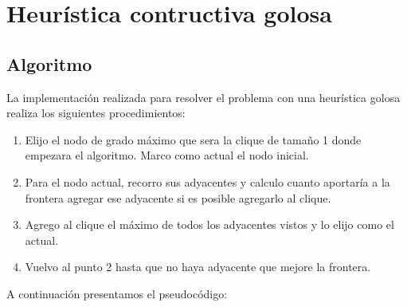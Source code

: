 \documentclass[a4paper, 10pt, twoside]{article}
\newenvironment{pseudo}[1][]{%
    \vspace{1em}%
    \begin{algorithmic}%
}
{%
    \end{algorithmic}%
    \vspace{1em}%
}
\begin{document}
\begin{pseudo}
\EndProcedure
\end{pseudo}



\newpage

\section{Heurística contructiva golosa}
\subsection{Algoritmo}
La implementación realizada para resolver el problema con una heurística golosa realiza los siguientes procedimientos:
\begin{enumerate}
\item Elijo el nodo de grado máximo que sera la clique de tamaño 1 donde empezara el algoritmo. Marco como actual el nodo inicial.
\item Para el nodo actual, recorro sus adyacentes y calculo cuanto aportaría a la frontera agregar ese adyacente si es posible agregarlo al clique.
\item Agrego al clique el máximo de todos los adyacentes vistos y lo elijo como el actual.
\item Vuelvo al punto 2 hasta que no haya adyacente que mejore la frontera.
\end{enumerate}

A continuación presentamos el pseudocódigo:
\end{document}
